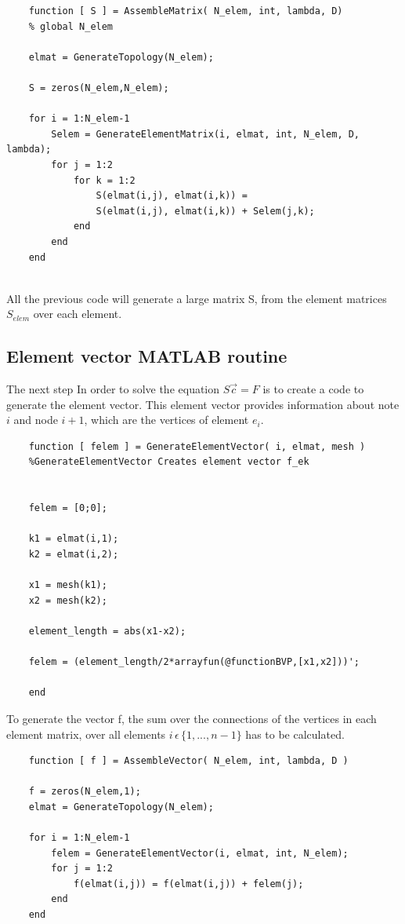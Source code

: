 \documentclass[a4paper]{report}
\begin{document}
\begin{lstlisting}
	function [ S ] = AssembleMatrix( N_elem, int, lambda, D)
	% global N_elem 
	
	elmat = GenerateTopology(N_elem);
	
	S = zeros(N_elem,N_elem);
	
	for i = 1:N_elem-1
		Selem = GenerateElementMatrix(i, elmat, int, N_elem, D, lambda);
		for j = 1:2
			for k = 1:2
				S(elmat(i,j), elmat(i,k)) =
				S(elmat(i,j), elmat(i,k)) +	Selem(j,k);
			end
		end
	end


\end{lstlisting}



All the previous code will generate a large matrix S, from the element matrices $S_{elem}$ over each element.\\



\subsection{Element vector MATLAB routine}

The next step In order to solve the equation $S\vec{c}=F$ is to create a code to generate the element vector. This element vector provides information about note $i$ and node $i+1$, which are the vertices of element $e_i$.\\



\begin{lstlisting}
	function [ felem ] = GenerateElementVector( i, elmat, mesh )
	%GenerateElementVector Creates element vector f_ek
	
	
	felem = [0;0];
	
	k1 = elmat(i,1);
	k2 = elmat(i,2);
	
	x1 = mesh(k1);
	x2 = mesh(k2);
	
	element_length = abs(x1-x2);
	
	felem = (element_length/2*arrayfun(@functionBVP,[x1,x2]))';
	
	end
\end{lstlisting}

\smallskip

To generate the vector f, the sum over the connections of the vertices in each element matrix, over all elements $i\,\epsilon\, \{1,...,n-1\}$  has to be calculated. 

\bigskip

	
\begin{lstlisting}
	function [ f ] = AssembleVector( N_elem, int, lambda, D )
		
	f = zeros(N_elem,1);
	elmat = GenerateTopology(N_elem);
		
	for i = 1:N_elem-1
		felem = GenerateElementVector(i, elmat, int, N_elem);
		for j = 1:2
			f(elmat(i,j)) = f(elmat(i,j)) + felem(j);
		end
	end
\end{lstlisting}	
\end{document}
